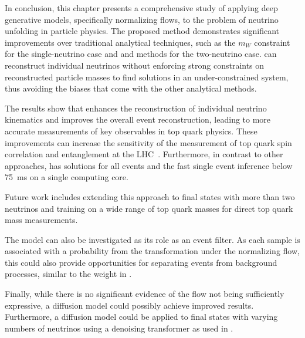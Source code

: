 In conclusion, this chapter presents a comprehensive study of applying deep generative models, specifically normalizing flows, to the problem of neutrino unfolding in particle physics.
The proposed \vvflows method demonstrates significant improvements over traditional analytical techniques, such as the $m_W$ constraint for the single-neutrino case and \vweight and \ellipse methods for the two-neutrino case.
\vvflows can reconstruct individual neutrinos without enforcing strong constraints on reconstructed particle masses to find solutions in an under-constrained system, thus avoiding the biases that come with the other analytical methods.

The results show that \vvflows enhances the reconstruction of individual neutrino kinematics and improves the overall event reconstruction, leading to more accurate measurements of key observables in top quark physics.
These improvements can increase the sensitivity of the measurement of top quark spin correlation and entanglement at the LHC~\cite{CMS:2015cal}.
Furthermore, in contrast to other approaches, \vvflows has solutions for all events and the fast single event inference below 75~ms on a single computing core.

Future work includes extending this approach to final states with more than two neutrinos and training on a wide range of top quark masses for direct top quark mass measurements.

The model can also be investigated as its role as an event filter.
As each sample is associated with a probability from the transformation under the normalizing flow, this could also provide opportunities for separating \ttbar events from background processes, similar to the weight in \vweight.

Finally, while there is no significant evidence of the flow not being sufficiently expressive, a diffusion model could possibly achieve improved results.
Furthermore, a diffusion model could be applied to final states with varying numbers of neutrinos using a denoising transformer as used in .
